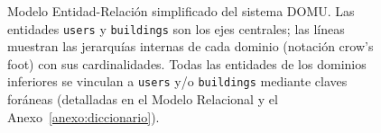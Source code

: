 \begin{figure}[H]
{\begin{tikzpicture}
\end{tikzpicture}
}%
\caption{Modelo Entidad-Relación simplificado del sistema DOMU.
  Las entidades \texttt{users} y \texttt{buildings} son los ejes centrales;
  las líneas muestran las jerarquías internas de cada dominio (notación crow's foot) con sus cardinalidades.
  Todas las entidades de los dominios inferiores se vinculan a \texttt{users} y/o \texttt{buildings}
  mediante claves foráneas (detalladas en el Modelo Relacional y el Anexo~\ref{anexo:diccionario}).}
\label{fig:mer}
\end{figure}
